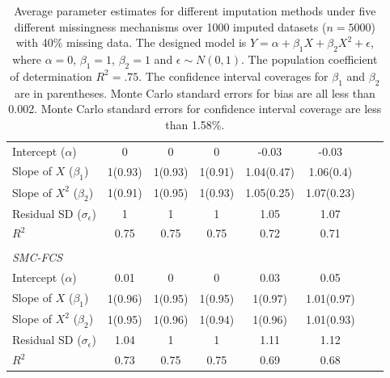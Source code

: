 \begin{table}[ht!]
{\begin{tabular}{lcccccrl}
				Intercept ($\alpha$)				&0		&0	&0	&-0.03	&-0.03\\
				Slope of $X$ ($\beta_1$)			&1(0.93)		&1(0.93)		&1(0.91)		&1.04(0.47)	&1.06(0.4)\\	
				Slope of $X^2$ ($\beta_2$)		&1(0.91)		&1(0.95)		&1(0.93)	&1.05(0.25)	&1.07(0.23)\\	
				Residual SD ($\sigma_\epsilon$) 	&1		&1		&1		&1.05	&1.07\\	
				$R^2$						&0.75	&0.75	&0.75	&0.72	&0.71\\\\
				\textit{SMC-FCS}	&&&&&\\
				Intercept ($\alpha$)				&0.01	&0	&0	&0.03	&0.05\\
				Slope of $X$ ($\beta_1$)			&1(0.96)	&1(0.95)	&1(0.95)	&1(0.97)	&1.01(0.97)\\
				Slope of $X^2$ ($\beta_2$)		&1(0.95)	&1(0.96)	&1(0.94)	&1(0.96)	&1.01(0.93)\\
				Residual SD ($\sigma_\epsilon$) 	&1.04	&1	&1	&1.11	&1.12\\
				$R^2$						&0.73	&0.75	&0.75		&0.69	&0.68\\\hline
			\end{tabular}
		}
		\caption{Average parameter estimates for different imputation methods under five different missingness mechanisms over 1000 imputed datasets ($n=5000$) with 40\% missing data. The designed model is $Y = \alpha + \beta_1X + \beta_2 X^2 + \epsilon$, where $\alpha=0$, $\beta_1=1$, $\beta_2=1$ and $\epsilon \sim N (0,1)$. The population coefficient of determination $R^2=.75$. The confidence interval coverages for $\beta_1$ and $\beta_2$ are in parentheses. Monte Carlo standard errors for bias are all less than 0.002. Monte Carlo standard errors for confidence interval coverage are less than 1.58\%.}
		\label{tab3_2}
		
	\end{table}
	
